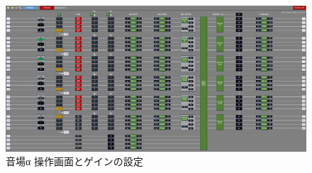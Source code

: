 \documentclass[11pt,a4j]{jreport}
\begin{document}
\newpage

\begin{figure}[H]
  \centering
  \includegraphics[width=.9\linewidth]{images/experimentField/afcParameters/01alpha/01overall.jpg}
  \caption{音場α 操作画面とゲインの設定}
  \label{fig:alpha操作画面}
\end{figure}
\end{document}
